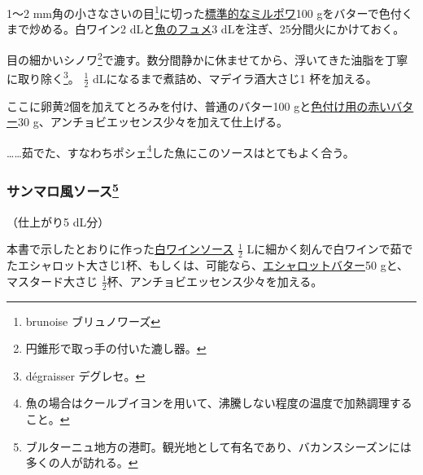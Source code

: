 \begin{recette}


1〜2 mm角の小さなさいの目\footnote{brunoise ブリュノワーズ}に切った\protect\hyperlink{}{標準的なミルポワ}100
gをバターで色付くまで炒める。白ワイン2
dLと\protect\hyperlink{fumet-de-poisson}{魚のフュメ}3
dLを注ぎ、25分間火にかけておく。

目の細かいシノワ\footnote{円錐形で取っ手の付いた漉し器。}で漉す。数分間静かに休ませてから、浮いてきた油脂を丁寧に取り除く\footnote{dégraisser
  デグレセ。}。 \(\frac{1}{2}\) dLになるまで煮詰め、マデイラ酒大さじ1
杯を加える。

ここに卵黄2個を加えてとろみを付け、普通のバター100
gと\protect\hyperlink{beurre-colorant-rouge}{色付け用の赤いバター}30
g、アンチョビエッセンス少々を加えて仕上げる。

\ldots{}\ldots{}茹でた、すなわちポシェ\footnote{魚の場合はクールブイヨンを用いて、沸騰しない程度の温度で加熱調理すること。}した魚にこのソースはとてもよく合う。

\hypertarget{sauce-saint-malo}{%
\subsubsection[サンマロ風ソース]{\texorpdfstring{サンマロ風ソース\footnote{ブルターニュ地方の港町。観光地として有名であり、バカンスシーズンには多くの人が訪れる。}}{サンマロ風ソース}}\label{sauce-saint-malo}}



（仕上がり5 dL分）

本書で示したとおりに作った\protect\hyperlink{sauce-vin-blanc}{白ワインソース}
\(\frac{1}{2}\)
Lに細かく刻んで白ワインで茹でたエシャロット大さじ1杯、もしくは、可能なら、\protect\hyperlink{beurre-d-echalote}{エシャロットバター}50
gと、マスタード大さじ
\(\frac{1}{2}\)杯、アンチョビエッセンス少々を加える。


\end{recette}
